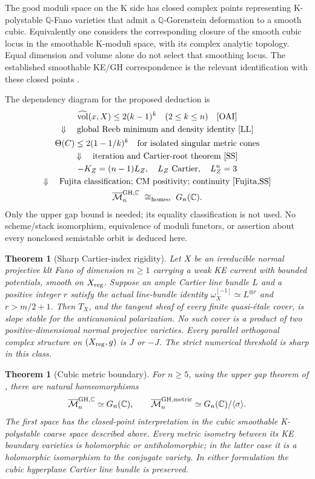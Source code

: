 \documentclass[11pt]{article}
\newtheorem{theorem}[proposition]{Theorem}
\newcommand{\nv}{\widehat{\operatorname{vol}}}
\newcommand{\C}{\mathbb C}
\newcommand{\Q}{\mathbb Q}
\begin{document}
The good moduli space on the K side has closed complex points representing
K-polystable $\Q$-Fano varieties that admit a $\Q$-Gorenstein deformation
to a smooth cubic. Equivalently one considers the corresponding closure
of the smooth cubic locus in the smoothable K-moduli space, with its
complex analytic topology. Equal dimension and volume alone do not select
that smoothing locus. The established smoothable KE/GH correspondence is
the relevant identification with these closed points \cite{LWX}.

The dependency diagram for the proposed deduction is
\[
\begin{gathered}
\nv(x,X)\leq2(k-1)^k\quad(2\leq k\leq n)\quad\text{\cite{OAI}}\\
\Downarrow\quad\text{global Reeb minimum and density identity \cite{LL}}\\
\Theta(C)\leq2(1-1/k)^k\quad\text{for isolated singular metric cones}\\
\Downarrow\quad\text{iteration and Cartier-root theorem \cite{SS}}\\
-K_Z=(n-1)L_Z,\quad L_Z\text{ Cartier},\quad L_Z^n=3\\
\Downarrow\quad\text{Fujita classification; CM positivity; continuity \cite{Fujita,SS}}\\
\overline{\mathcal M}_{n}^{\rm GH,\C}\ \cong_{\rm homeo}\ G_n(\C).
\end{gathered}
\]
Only the upper gap bound is needed; its equality classification is not
used. No scheme/stack isomorphism, equivalence of moduli functors, or
assertion about every nonclosed semistable orbit is deduced here.

\begin{theorem}[Sharp Cartier-index rigidity]\label{thm:index}
Let $X$ be an irreducible normal projective klt Fano of dimension $m\geq1$
carrying a weak KE current with bounded potentials, smooth on $X_{\rm reg}$.
Suppose an ample Cartier line bundle $L$ and a positive integer $r$
satisfy the actual line-bundle identity
$\omega_X^{[-1]}\simeq L^{\otimes r}$ and $r>m/2+1$.
Then $T_X$, and the tangent sheaf of every finite quasi-\'etale cover,
is slope stable for the anticanonical polarization. No such cover is
a product of two positive-dimensional normal projective varieties.
Every parallel orthogonal complex structure on $(X_{\rm reg},g)$
is $J$ or $-J$. The strict numerical threshold is sharp in this class.
\end{theorem}

\begin{theorem}[Cubic metric boundary]\label{thm:metric}
For $n\geq5$, using the upper gap theorem of \cite{OAI}, there are natural
homeomorphisms
\[
\overline{\mathcal M}_{n}^{\rm GH,\C}\simeq G_n(\C),
\qquad
\overline{\mathcal M}_{n}^{\rm GH,metric}
\simeq G_n(\C)/\langle\sigma\rangle.
\]
The first space has the closed-point interpretation in the cubic
smoothable K-polystable coarse space described above. Every metric
isometry between its KE boundary varieties is holomorphic or
antiholomorphic; in the latter case it is a holomorphic isomorphism
to the conjugate variety. In either formulation the cubic hyperplane
Cartier line bundle is preserved.
\end{theorem}
\end{document}

